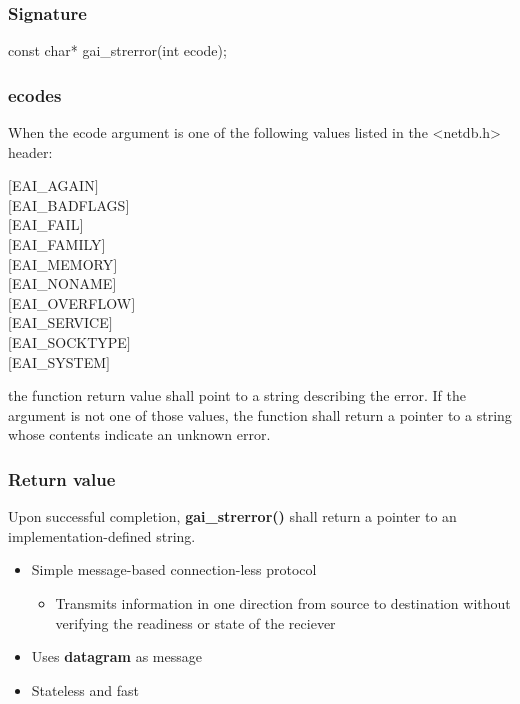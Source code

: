 \documentclass{report}
\begin{document}
    \subsubsection{Signature}
    \bigbreak \noindent 
    \begin{cppcode}
    const char* gai_strerror(int ecode);
    \end{cppcode}
    \bigbreak \noindent 
    \subsubsection{ecodes}
    \bigbreak \noindent 
    When the ecode argument is one of the following values listed in the <netdb.h> header:
    \bigbreak \noindent 
    \begin{center}
        $[$EAI\_AGAIN$]$\\
        $[$EAI\_BADFLAGS$]$\\
        $[$EAI\_FAIL$]$\\
        $[$EAI\_FAMILY$]$\\
        $[$EAI\_MEMORY$]$\\
        $[$EAI\_NONAME$]$\\
        $[$EAI\_OVERFLOW$]$\\
        $[$EAI\_SERVICE$]$\\
        $[$EAI\_SOCKTYPE$]$\\
        $[$EAI\_SYSTEM$]$
    \end{center}
    \bigbreak \noindent 
    the function return value shall point to a string describing the error. If the argument is not one of those values, the function shall return a pointer to a string whose contents indicate an unknown error.
    \bigbreak \noindent 
    \subsubsection{Return value}
    \bigbreak \noindent 
    Upon successful completion, \textbf{gai\_strerror()} shall return a pointer to an implementation-defined string.



    

    \pagebreak 
    \bigbreak \noindent 
    \begin{itemize}
        \item Simple message-based connection-less protocol
            \begin{itemize}
                \item Transmits information in one direction from source to destination without verifying the readiness or state of the reciever
            \end{itemize}
        \item Uses \textbf{datagram} as message
        \item Stateless and fast
    \end{itemize}
\end{document}

